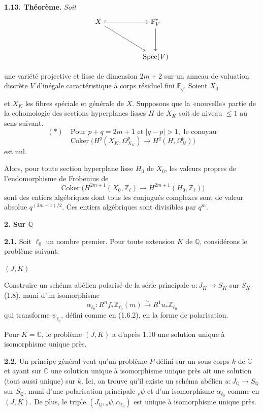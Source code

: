 \documentclass[10pt]{article}
\newcommand{\C}{\mathbb C}
\newcommand{\F}{\mathbb F}
\newcommand{\Pj}{\mathbb P}
\newcommand{\Q}{\mathbb Q}
\newcommand{\Z}{\mathbb Z}
\newcommand{\Spec}{\operatorname{Spec}}
\newcommand{\Coker}{\operatorname{Coker}}
\newcommand{\iso}{\xrightarrow{\sim}}
\newcommand{\sourcebreak}{\clearpage}
\begin{document}
\noindent\textbf{1.13. Théorème.} \emph{Soit}
\[
\begin{tikzcd}[column sep=5em,row sep=3.2em]
X \arrow[r,hook] \arrow[dr] & \Pj_V^r \arrow[d]\\
& \Spec(V)
\end{tikzcd}
\]
\begin{itshape}
une variété projective et lisse de dimension \(2m+2\) sur un anneau de valuation discrète \(V\) d'inégale caractéristique à corps résiduel fini \(\F_q\). Soient \(X_0\)

\sourcebreak
et \(X_K\) les fibres spéciale et générale de \(X\). Supposons que la «nouvelle» partie de la cohomologie des sections hyperplanes lisses \(H\) de \(X_K\) soit de niveau \(\leq1\) au sens suivant.
\[
(*)\quad \text{Pour }p+q=2m+1\text{ et }|q-p|>1,\text{ le conoyau}
\]
\[
\Coker\bigl(H^q(X_K,\Omega^p_{X_K})\longrightarrow H^q(H,\Omega^p_H)\bigr)
\]
est nul.

Alors, pour toute section hyperplane lisse \(H_0\) de \(X_0\), les valeurs propres de l'endomorphisme de Frobenius de
\[
\Coker\bigl(H^{2m+1}(X_0,\Z_\ell)\longrightarrow H^{2m+1}(H_0,\Z_\ell)\bigr)
\]
sont des entiers algébriques dont tous les conjugués complexes sont de valeur absolue \(q^{(2m+1)/2}\). Ces entiers algébriques sont divisibles par \(q^m\).
\end{itshape}

\begin{center}\bfseries 2. Sur \(\Q\)\end{center}

\noindent\textbf{2.1.} Soit \(\ell_0\) un nombre premier. Pour toute extension \(K\) de \(\Q\), considérons le problème suivant:

\noindent\((J,K)\)\quad
\begin{minipage}[t]{0.82\linewidth}
Construire un schéma abélien polarisé de la série principale \(u:J_K\longrightarrow S_K\) sur \(S_K\) (1.8), muni d'un isomorphisme
\[
\alpha_{\ell_0}:R^nf_*\Z_{\ell_0}(m)\iso R^1u_*\Z_{\ell_0}
\]
qui transforme \(\psi_{\ell_0}\), défini comme en (1.6.2), en la forme de polarisation.
\end{minipage}

Pour \(K=\C\), le problème \((J,K)\) a d'après 1.10 une solution unique à isomorphisme unique près.

\noindent\textbf{2.2.} Un principe général veut qu'un problème \(P\) défini sur un sous-corps \(k\) de \(\C\) et ayant sur \(\C\) une solution unique à isomorphisme unique près ait une solution (tout aussi unique) sur \(k\). Ici, on trouve qu'il existe un schéma abélien \(u:J_\Q\longrightarrow S_\Q\) sur \(S_\Q\), muni d'une polarisation principale \({}_s\psi\) et d'un isomorphisme \(\alpha_{\ell_0}\) comme en \((J,K)\). De plus, le triple \((J_\Q,{}_s\psi,\alpha_{\ell_0})\) est unique à isomorphisme unique près.
\end{document}
